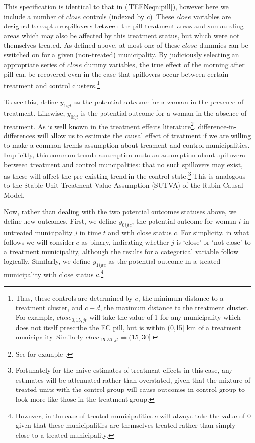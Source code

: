 This specification is identical to that in (\ref{TEENeqn:pill}), however here we 
include a number of $close$ controls (indexed by $c$).  These $close$ variables are 
designed to capture spillovers between the pill treatment areas and surrounding 
areas which may also be affected by this treatment status, but which were not 
themselves treated.  As defined above, at most one of these $close$ dummies can
be switched on for a given (non-treated) municipality.  By judiciously selecting 
an appropriate series of $close$ dummy variables, the true effect of the morning 
after pill can be recovered even in the case that spillovers occur between 
certain treatment and control clusters.\footnote{Thus, these controls are 
determined by $c$, the minimum distance to a treatment cluster, and $c+d$, 
the maximum distance to the treatment cluster. For example, $close_{0,15,jt}$ 
will take the value of 1 for any municipality which does not itself prescribe 
the EC pill, but is within (0,15] km of a treatment municipality.  Similarly 
$close_{15,30,jt}\Rightarrow (15,30]$.}

To see this, define $y_{1ijt}$ as the potential outcome for a woman in the 
presence of treatment.  Likewise, $y_{0ijt}$ is the potential outcome for a 
woman in the absence of treatment.  As is well known in the treatment effects
literature\footnote{See for example \citet{CardKruger1994}.}, difference-in-%
differences will allow us to estimate the causal effect of treatment if we are 
willing to make a common trends assumption about treament and control 
municipalities.  Implicitly, this common trends assumption nests an assumption
about spillovers between treatment and control muncipalities: that no such 
spillovers may exist, as these will affect the pre-existing trend in the control 
state.\footnote{Fortunately for the naive estimates of treatment effects in this 
case, any estimates will be attenuated rather than overstated, given that the 
mixture of treated units with the control group will cause outcomes in control 
group to look more like those in the treatment group.}  This is analogous to the 
Stable Unit Treatment Value Assumption (SUTVA) of the Rubin Causal Model.

Now, rather than dealing with the two potential outcomes statuses above, we
define new outcomes.  First, we define $y_{0ijtc}$, the potential outcome for 
woman $i$ in untreated municipality $j$ in time $t$ and with close status $c$.  
For simplicity, in what follows we will consider $c$ as binary, indicating whether
$j$ is `close' or `not close' to a treatment municipality, although the results
for a categorical variable follow logically.  Similarly, we define $y_{1ijtc}$
as the potential outcome in a treated municipality with close status 
$c$.\footnote{However, in the case of treated municipalities $c$ will always
take the value of 0 given that these municipalities are themselves treated rather
than simply close to a treated municipality.}

